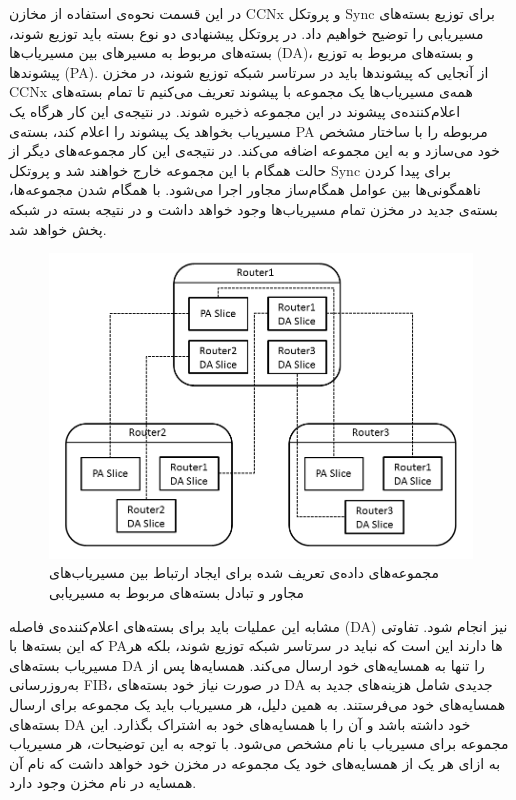 
در این قسمت نحوه‌ی استفاده از مخازن CCNx و پروتکل Sync برای توزیع بسته‌های مسیریابی را توضیح خواهیم داد. در پروتکل پیشنهادی دو نوع بسته باید توزیع شوند، بسته‌های مربوط به مسیرهای بین مسیریاب‌ها (DA)، و بسته‌های مربوط به توزیع پیشوندها (PA). از آنجایی که پیشوندها باید در سرتاسر شبکه توزیع شوند، در مخزن CCNx همه‌ی مسیریاب‌ها یک مجموعه با پیشوند  تعریف می‌کنیم تا تمام بسته‌های اعلام‌کننده‌ی پیشوند در این مجموعه ذخیره شوند. در نتیجه‌ی این کار هرگاه یک مسیریاب بخواهد یک پیشوند را اعلام کند، بسته‌ی PA مربوطه را با ساختار مشخص خود می‌سازد و به این مجموعه اضافه می‌کند. در نتیجه‌ی این کار مجموعه‌های دیگر از حالت همگام با این مجموعه خارج خواهند شد و پروتکل Sync برای پیدا کردن ناهمگونی‌ها بین عوامل همگام‌ساز مجاور اجرا می‌شود. با همگام شدن مجموعه‌ها، بسته‌ی جدید در مخزن تمام مسیریاب‌ها وجود خواهد داشت و در نتیجه بسته در شبکه پخش خواهد شد.

\begin{figure}[h!]
\centering
\includegraphics[scale=0.7]{./resources/figures/connection.png}
\caption{مجموعه‌های داده‌ی تعریف شده برای ایجاد ارتباط بین مسیریاب‌های مجاور و تبادل بسته‌های مربوط به مسیریابی}
\label{fig:connection}
\end{figure}

مشابه این عملیات باید برای بسته‌های اعلام‌کننده‌ی فاصله (DA) نیز انجام شود. تفاوتی که این بسته‌ها با PAها دارند این است که نباید در سرتاسر شبکه توزیع شوند، بلکه هر مسیریاب بسته‌های DA را تنها به همسایه‌های خود ارسال می‌کند. همسایه‌ها پس از به‌روزرسانی FIB، در صورت نیاز خود بسته‌های DA جدیدی شامل هزینه‌های جدید به همسایه‌های خود می‌فرستند. به همین دلیل، هر مسیریاب باید یک مجموعه برای ارسال بسته‌های DA خود داشته باشد و آن را با همسایه‌های خود به اشتراک بگذارد. این مجموعه برای مسیریاب  با نام   مشخص می‌شود. با توجه به این توضیحات، هر مسیریاب به ازای هر یک از همسایه‌های خود یک مجموعه در مخزن خود خواهد داشت که نام آن همسایه در نام مخزن وجود دارد. 

